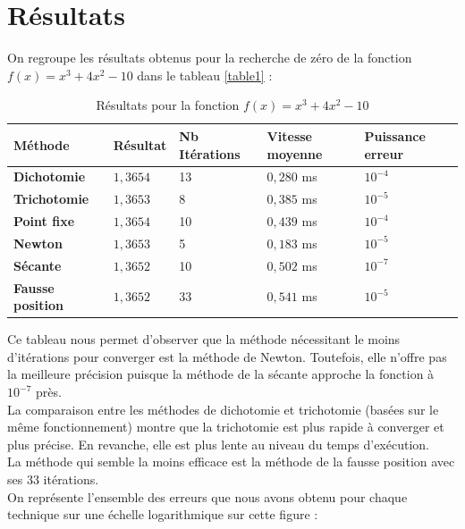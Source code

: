 \documentclass[12pt]{article}
\begin{document}
\section{Résultats}
\label{ref:resultats}
\noindent On regroupe les résultats obtenus pour la recherche de zéro de la fonction $f(x) = x^3 + 4x^2 -10$ dans le tableau \ref{table1} :
\begin{table}[H]
    \centering
    \begin{tabularx}{\linewidth}{|l|X|X|X|X|}
        \hline
        \textbf{Méthode} & \textbf{Résultat} & \textbf{Nb Itérations} & \textbf{Vitesse moyenne} & \textbf{Puissance erreur} \\
        \hline
        \textbf{Dichotomie} & $1,3654$ & 13 & $0,280$ ms & $10^{-4}$ \\
        \hline
        \textbf{Trichotomie} & $1,3653$ & 8 & $0,385$ ms & $10^{-5}$ \\
        \hline
        \textbf{Point fixe} & $1,3654$ & 10 & $0,439$ ms & $10^{-4}$ \\
        \hline
        \textbf{Newton} & $1,3653$ & 5 & $0,183$ ms & $10^{-5}$ \\
        \hline
        \textbf{Sécante} & $1,3652$ & 10 & $0,502$ ms & $10^{-7}$ \\
        \hline
        \textbf{Fausse position} & $1,3652$ & 33 & $0,541$ ms & $10^{-5}$ \\
        \hline
    \end{tabularx}
    \caption{Résultats pour la fonction $f(x) = x^3 + 4x^2 -10$}
    \label{table1}
    \label{tab:tableau}
\end{table}
\noindent Ce tableau nous permet d'observer que la méthode nécessitant le moins d'itérations pour converger est la méthode de Newton. Toutefois, elle n'offre pas la meilleure précision puisque la méthode de la sécante approche la fonction à $10^{-7}$ près.\\
La comparaison entre les méthodes de dichotomie et trichotomie (basées sur le même fonctionnement) montre que la trichotomie est plus rapide à converger et plus précise. En revanche, elle est plus lente au niveau du temps d'exécution.\\
La méthode qui semble la moins efficace est la méthode de la fausse position avec ses 33 itérations.\\
On représente l'ensemble des erreurs que nous avons obtenu pour chaque technique sur une échelle logarithmique sur cette figure :
\end{document}
